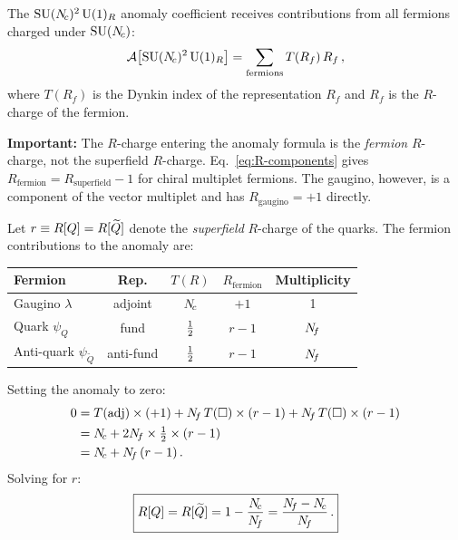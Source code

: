 \documentclass[11pt,a4paper]{article}
\begin{document}
The $\mathrm{SU}(N_{\!c})^2\,\mathrm{U}(1)_R$ anomaly coefficient receives contributions
from all fermions charged under $\mathrm{SU}(N_{\!c})$:
\begin{equation}
  \mathcal{A}\bigl[\mathrm{SU}(N_{\!c})^2\, \mathrm{U}(1)_R\bigr]
  = \sum_{\text{fermions}} T(R_f)\, R_f\,,
  \label{eq:anomaly-coefficient}
\end{equation}
where $T(R_f)$ is the Dynkin index of the representation $R_f$
and $R_f$ is the $R$-charge of the fermion.

\textbf{Important:} The $R$-charge entering the anomaly formula is the
\emph{fermion} $R$-charge, not the superfield $R$-charge.
Eq.~\eqref{eq:R-components} gives $R_{\text{fermion}} = R_{\text{superfield}} - 1$
for chiral multiplet fermions.  The gaugino, however, is a component
of the vector multiplet and has $R_{\text{gaugino}} = +1$ directly.

Let $r \equiv R[Q] = R[\widetilde{Q}]$ denote the
\emph{superfield} $R$-charge of the quarks.  The fermion contributions
to the anomaly are:

\begin{center}
\renewcommand{\arraystretch}{1.3}
\begin{tabular}{@{}l c c c c@{}}
\toprule
\textbf{Fermion} & \textbf{Rep.} & $T(R)$ & $R_{\text{fermion}}$
  & \textbf{Multiplicity} \\
\midrule
Gaugino $\lambda$ & adjoint & $N_{\!c}$ & $+1$ & 1 \\
Quark $\psi_Q$ & fund & $\tfrac{1}{2}$ & $r - 1$ & $N_{\!f}$ \\
Anti-quark $\psi_{\widetilde{Q}}$ & anti-fund & $\tfrac{1}{2}$ & $r - 1$ & $N_{\!f}$ \\
\bottomrule
\end{tabular}
\end{center}

Setting the anomaly to zero:
\begin{align}
  0 &= T(\mathrm{adj}) \times (+1) + N_{\!f}\, T(\square) \times (r - 1)
       + N_{\!f}\, T(\square) \times (r - 1) \nonumber \\
    &= N_{\!c} + 2N_{\!f} \times \tfrac{1}{2} \times (r - 1) \nonumber \\
    &= N_{\!c} + N_{\!f}\,(r - 1)\,.
  \label{eq:R-anomaly-cancel}
\end{align}
Solving for $r$:
\begin{equation}
  \boxed{
    R[Q] = R[\widetilde{Q}]
    = 1 - \frac{N_{\!c}}{N_{\!f}}
    = \frac{N_{\!f} - N_{\!c}}{N_{\!f}}\,.
  }
  \label{eq:R-charge-result}
\end{equation}
\end{document}
